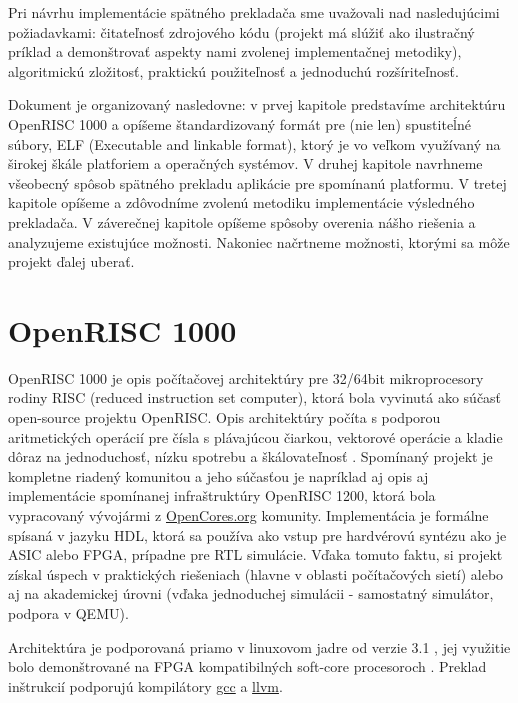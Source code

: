 \documentclass[conference]{IEEEtran}
\begin{document}
Pri návrhu implementácie spätného prekladača sme uvažovali nad nasledujúcimi požiadavkami: čitateľnosť zdrojového kódu (projekt má slúžiť ako ilustračný príklad a demonštrovať aspekty nami zvolenej implementačnej metodiky), algoritmickú zložitosť, praktickú použiteľnosť a jednoduchú rozšíriteľnosť.

Dokument je organizovaný nasledovne: v prvej kapitole predstavíme architektúru OpenRISC 1000 a opíšeme štandardizovaný formát pre (nie len) spustiteĺné súbory, ELF (Executable and linkable format), ktorý je vo veľkom využívaný na širokej škále platforiem a operačných systémov. V druhej kapitole navrhneme všeobecný spôsob spätného prekladu aplikácie pre spomínanú platformu. V tretej kapitole opíšeme a zdôvodníme zvolenú metodiku implementácie výsledného prekladača. V záverečnej kapitole opíšeme spôsoby overenia nášho riešenia a analyzujeme existujúce možnosti. Nakoniec načrtneme možnosti, ktorými sa môže projekt ďalej uberať.


\section{OpenRISC 1000}

OpenRISC 1000 je opis počítačovej architektúry pre 32/64bit mikroprocesory rodiny RISC (reduced instruction set computer), ktorá bola vyvinutá ako súčasť open-source projektu OpenRISC. Opis architektúry počíta s podporou aritmetických operácií pre čísla s plávajúcou čiarkou, vektorové operácie a kladie dôraz na jednoduchosť, nízku spotrebu a škálovateľnosť \cite{or1kv13}. Spomínaný projekt je kompletne riadený komunitou a jeho súčasťou je napríklad aj opis aj implementácie spomínanej infraštruktúry OpenRISC 1200\cite{Faroudja2012EmbeddedNS}, ktorá bola vypracovaný vývojármi z \href{https://opencores.org/}{OpenCores.org} komunity. Implementácia je formálne spísaná v jazyku HDL, ktorá sa používa ako vstup pre hardvérovú syntézu ako je ASIC alebo FPGA, prípadne pre RTL simulácie. Vďaka tomuto faktu, si projekt získal úspech v praktických riešeniach (hlavne v oblasti počítačových sietí) alebo aj na akademickej úrovni (vďaka jednoduchej simulácii - samostatný simulátor, podpora v QEMU).

Architektúra je podporovaná priamo v linuxovom jadre od verzie 3.1 \cite{linuxor1k}, jej využitie bolo demonštrované na FPGA kompatibilných soft-core procesoroch \cite{}. Preklad inštrukcií podporujú kompilátory \href{https://github.com/openrisc/or1k-gcc}{gcc} a \href{https://github.com/openrisc/llvm-or1k}{llvm}.
\end{document}
